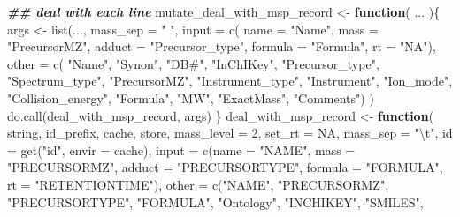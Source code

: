 \documentclass[
]{article}
\newenvironment{Shaded}{\begin{snugshade}}{\end{snugshade}}
\newcommand{\AttributeTok}[1]{\textcolor[rgb]{0.77,0.63,0.00}{#1}}
\newcommand{\ConstantTok}[1]{\textcolor[rgb]{0.00,0.00,0.00}{#1}}
\newcommand{\ControlFlowTok}[1]{\textcolor[rgb]{0.13,0.29,0.53}{\textbf{#1}}}
\newcommand{\DecValTok}[1]{\textcolor[rgb]{0.00,0.00,0.81}{#1}}
\newcommand{\DocumentationTok}[1]{\textcolor[rgb]{0.56,0.35,0.01}{\textbf{\textit{#1}}}}
\newcommand{\FunctionTok}[1]{\textcolor[rgb]{0.00,0.00,0.00}{#1}}
\newcommand{\NormalTok}[1]{#1}
\newcommand{\OtherTok}[1]{\textcolor[rgb]{0.56,0.35,0.01}{#1}}
\newcommand{\SpecialCharTok}[1]{\textcolor[rgb]{0.00,0.00,0.00}{#1}}
\newcommand{\StringTok}[1]{\textcolor[rgb]{0.31,0.60,0.02}{#1}}
\begin{document}
\begin{Shaded}
\begin{Highlighting}[]
\DocumentationTok{\#\# deal with each line}
\NormalTok{mutate\_deal\_with\_msp\_record }\OtherTok{\textless{}{-}} 
  \ControlFlowTok{function}\NormalTok{(}
\NormalTok{    ...}
\NormalTok{    )\{}
\NormalTok{    args }\OtherTok{\textless{}{-}} \FunctionTok{list}\NormalTok{(...,}
      \AttributeTok{mass\_sep =} \StringTok{" "}\NormalTok{,}
      \AttributeTok{input =} \FunctionTok{c}\NormalTok{(}
        \AttributeTok{name =} \StringTok{"Name"}\NormalTok{,}
        \AttributeTok{mass =} \StringTok{"PrecursorMZ"}\NormalTok{, }
        \AttributeTok{adduct =} \StringTok{"Precursor\_type"}\NormalTok{,}
        \AttributeTok{formula =} \StringTok{"Formula"}\NormalTok{,}
        \AttributeTok{rt =} \StringTok{"NA"}\NormalTok{),}
      \AttributeTok{other =} \FunctionTok{c}\NormalTok{(}
        \StringTok{"Name"}\NormalTok{, }\StringTok{"Synon"}\NormalTok{, }\StringTok{"DB\#"}\NormalTok{, }\StringTok{"InChIKey"}\NormalTok{,}
        \StringTok{"Precursor\_type"}\NormalTok{, }\StringTok{"Spectrum\_type"}\NormalTok{, }\StringTok{"PrecursorMZ"}\NormalTok{,}
        \StringTok{"Instrument\_type"}\NormalTok{, }\StringTok{"Instrument"}\NormalTok{, }\StringTok{"Ion\_mode"}\NormalTok{,}
        \StringTok{"Collision\_energy"}\NormalTok{, }\StringTok{"Formula"}\NormalTok{,}
        \StringTok{"MW"}\NormalTok{, }\StringTok{"ExactMass"}\NormalTok{, }\StringTok{"Comments"}\NormalTok{)}
\NormalTok{    )}
    \FunctionTok{do.call}\NormalTok{(deal\_with\_msp\_record, args)}
\NormalTok{  \}}
\NormalTok{deal\_with\_msp\_record }\OtherTok{\textless{}{-}}
  \ControlFlowTok{function}\NormalTok{(}
\NormalTok{    string,}
\NormalTok{    id\_prefix,}
\NormalTok{    cache,}
\NormalTok{    store,}
    \AttributeTok{mass\_level =} \DecValTok{2}\NormalTok{,}
    \AttributeTok{set\_rt =} \ConstantTok{NA}\NormalTok{,}
    \AttributeTok{mass\_sep =} \StringTok{"}\SpecialCharTok{\textbackslash{}t}\StringTok{"}\NormalTok{,}
    \AttributeTok{id =} \FunctionTok{get}\NormalTok{(}\StringTok{"id"}\NormalTok{, }\AttributeTok{envir =}\NormalTok{ cache),}
    \AttributeTok{input =} \FunctionTok{c}\NormalTok{(}\AttributeTok{name =} \StringTok{"NAME"}\NormalTok{,}
      \AttributeTok{mass =} \StringTok{"PRECURSORMZ"}\NormalTok{,}
      \AttributeTok{adduct =} \StringTok{"PRECURSORTYPE"}\NormalTok{,}
      \AttributeTok{formula =} \StringTok{"FORMULA"}\NormalTok{,}
      \AttributeTok{rt =} \StringTok{"RETENTIONTIME"}\NormalTok{),}
    \AttributeTok{other =} \FunctionTok{c}\NormalTok{(}\StringTok{"NAME"}\NormalTok{, }\StringTok{"PRECURSORMZ"}\NormalTok{, }\StringTok{"PRECURSORTYPE"}\NormalTok{,}
      \StringTok{"FORMULA"}\NormalTok{, }\StringTok{"Ontology"}\NormalTok{, }\StringTok{"INCHIKEY"}\NormalTok{, }\StringTok{"SMILES"}\NormalTok{,}

\end{Highlighting}
\end{Shaded}
\end{document}

